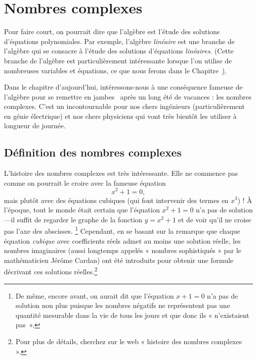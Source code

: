 

\chapter{Nombres complexes}

\label{chapter:Fr_01-Complex}



Pour faire court, on pourrait dire que l'algèbre est l'étude des solutions d'équations polynomiales.
Par exemple, l'algèbre \emph{linéaire} est une branche de l'algèbre qui se consacre à l'étude des solutions d'équations \emph{linéaires}. (Cette branche de l'algèbre est particulièrement intéressante lorsque l'on utilise de nombreuses variables et équations, ce que nous ferons dans le Chapitre~\href{chapter:11-solvingsystems}).



Dans le chapitre d'aujourd'hui, intéressons-nous à une conséquence fameuse de l'algèbre pour se \og remettre en jambes \fg~après un long été de vacances : les nombres complexes. C'est un incontournable pour nos chers ingénieurs (particulièrement en génie électrique) et nos chers physiciens qui vont très bientôt les utiliser à longueur de journée.


\section{Définition des nombres complexes}

L'histoire des nombres complexes est très intéressante. Elle ne commence pas comme on pourrait le croire avec la fameuse équation
$$
x^2 + 1 = 0,
$$ mais plutôt avec des équations cubiques (qui font intervenir des termes en $x^3$) !
À l'époque, tout le monde était certain que  l'équation $ x^2 + 1 = 0$
n'a pas de solution---il suffit de regarder le graphe de la fonction $y=x^2+1$ et de voir qu'il ne croise pas l'axe des abscisses. \footnote{De même, encore avant, on aurait dit que l'équation $x+1=0$ n'a pas de solution non plus puisque les nombres négatifs ne représentent pas une quantité mesurable dans la vie de tous les jours et que donc ils « n'existaient pas ».} Cependant, en se basant sur la remarque que chaque équation \emph{cubique} avec coefficients réels admet au moins une solution réelle, les nombres imaginaires (aussi longtemps appelés « nombres sophistiqués » par le mathématicien Jérôme Cardan) ont été introduits pour obtenir une formule décrivant ces solutions réelles.\footnote{Pour plus de détails, cherchez sur le web « histoire des nombres complexes ».} 



